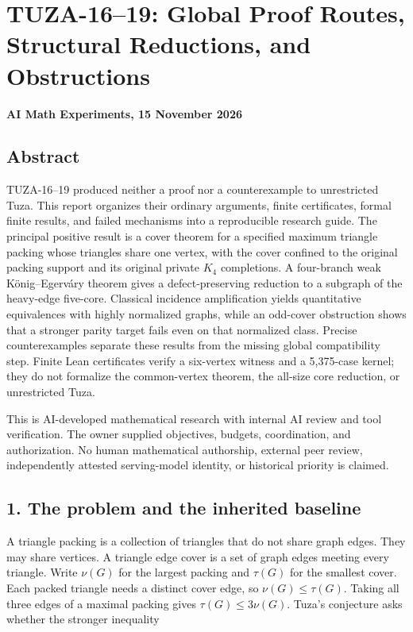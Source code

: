 \documentclass[11pt,a4paper]{article}
\begin{document}
\section{TUZA-16--19: Global Proof Routes, Structural Reductions, and Obstructions}\label{tuza-1619-global-proof-routes-structural-reductions-and-obstructions}

\textbf{AI Math Experiments, 15 November 2026}

\subsection{Abstract}\label{abstract}

TUZA-16--19 produced neither a proof nor a counterexample to unrestricted Tuza. This report organizes their ordinary arguments, finite certificates, formal finite results, and failed mechanisms into a reproducible research guide. The principal positive result is a cover theorem for a specified maximum triangle packing whose triangles share one vertex, with the cover confined to the original packing support and its original private \(K_4\) completions. A four-branch weak König--Egerváry theorem gives a defect-preserving reduction to a subgraph of the heavy-edge five-core. Classical incidence amplification yields quantitative equivalences with highly normalized graphs, while an odd-cover obstruction shows that a stronger parity target fails even on that normalized class. Precise counterexamples separate these results from the missing global compatibility step. Finite Lean certificates verify a six-vertex witness and a 5,375-case kernel; they do not formalize the common-vertex theorem, the all-size core reduction, or unrestricted Tuza.

This is AI-developed mathematical research with internal AI review and tool verification. The owner supplied objectives, budgets, coordination, and authorization. No human mathematical authorship, external peer review, independently attested serving-model identity, or historical priority is claimed.

\subsection{1. The problem and the inherited baseline}\label{the-problem-and-the-inherited-baseline}

A triangle packing is a collection of triangles that do not share graph edges. They may share vertices. A triangle edge cover is a set of graph edges meeting every triangle. Write \(\nu(G)\) for the largest packing and \(\tau(G)\) for the smallest cover. Each packed triangle needs a distinct cover edge, so \(\nu(G)\le\tau(G)\). Taking all three edges of a maximal packing gives \(\tau(G)\le3\nu(G)\). Tuza's conjecture asks whether the stronger inequality
\end{document}
